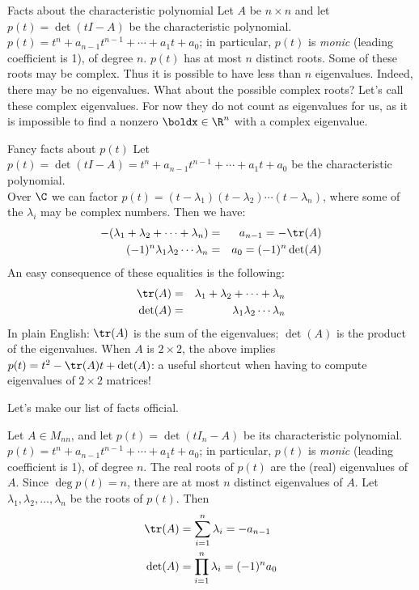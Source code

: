 \begin{frame}{Facts about the characteristic polynomial}
Let $A$ be $n\times n$ and let $p(t)=\det(tI-A)$ be the characteristic polynomial. 
\bb
\pause\ii $p(t)=t^n+a_{n-1}t^{n-1}+\cdots +a_1t+a_0$; in particular, $p(t)$ is {\em monic} (leading coefficient is 1), of degree $n$. 
\pause\ii  $p(t)$ has at most $n$ distinct roots. Some of these roots may be complex. Thus it is possible to have less than $n$ eigenvalues. Indeed, there may be no eigenvalues. 
\bpause 
What about the possible complex roots? Let's call these \alert{complex eigenvalues}. For now they do not count as eigenvalues for us, as it is impossible to find a nonzero $\boldx\in\R^n$ with a complex eigenvalue. 

\ee
\end{frame}
\begin{frame}{Fancy facts about $p(t)$}
\footnotesize
Let $p(t)=\det(tI-A)=t^n+a_{n-1}t^{n-1}+\cdots +a_1t+a_0$ be the characteristic polynomial. \\
Over $\C$ we can factor $p(t)=(t-\lambda_1)(t-\lambda_2)\cdots (t-\lambda_n)$, where some of the $\lambda_i$ may be complex numbers. 
\bpause Then we have: 
\begin{eqnarray*}
-(\lambda_1+\lambda_2+\cdots +\lambda_n)&=&a_{n-1}=-\tr(A)\\
(-1)^n\lambda_1\lambda_2\cdots\lambda_n&=&a_0=(-1)^n\det(A)
\end{eqnarray*}
\pause An easy consequence of these equalities is the following:
\begin{eqnarray*}
\tr(A)&=&\lambda_1+\lambda_2+\cdots +\lambda_n\\
\det(A)&=&\lambda_1\lambda_2\cdots\lambda_n
\end{eqnarray*}
In plain English: $\tr(A)$ is the sum of the eigenvalues; $\det(A)$ is the product of the eigenvalues. 
\bpause 
When $A$ is $2\times 2$, the above implies $p(t)=t^2-\tr(A)t+\det(A)$: a useful shortcut when having to compute eigenvalues of $2\times 2$ matrices! 
\end{frame}
\begin{frame}
 Let's make our list of facts official. 
 \begin{theorem}
 Let $A\in M_{nn}$, and let $p(t)=\det(tI_n-A)$ be its characteristic polynomial. 
 \bb[(a)]
 \ii $p(t)=t^n+a_{n-1}t^{n-1}+\cdots +a_1t+a_0$; in particular, $p(t)$ is {\em monic} (leading coefficient is 1), of degree $n$. 
 \ii The real roots of $p(t)$ are the (real) eigenvalues of $A$. Since $\deg p(t)=n$, there are at most $n$ distinct eigenvalues of $A$. 
 \ii Let $\lambda_1, \lambda_2, \dots, \lambda_n$ be the roots of $p(t)$. Then 
 \begin{align*}
 \tr(A)&=\sum_{i=1}^n\lambda_i=-a_{n-1}\\
 \det(A)&=\prod_{i=1}^n\lambda_i=(-1)^na_0
 \end{align*}
 \ee
 \end{theorem}
\end{frame}
